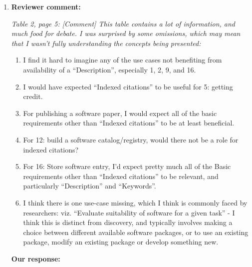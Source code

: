 \documentclass{article}
\begin{document}
\begin{enumerate}
\item \textbf{Reviewer comment:}
{\itshape
Table 2, page 5: [Comment] This table contains a lot of information, and much food for debate. I was surprised by some omissions, which may mean that I wasn't fully understanding the concepts being presented:
\begin{enumerate}[label={(\alph*)}]
\item I find it hard to imagine any of the use cases not benefiting from availability of a ``Description'', especially 1, 2, 9, and 16.
\item I would have expected ``Indexed citations'' to be useful for 5: getting credit.
\item For publishing a software paper, I would expect all of the basic requirements other than ``Indexed citations'' to be at least beneficial.
\item For 12: build a software catalog/registry, would there not be a role for indexed citations?
\item For 16: Store software entry, I'd expect pretty much all of the Basic requirements other than ``Indexed citations'' to be relevant, and particularly ``Description'' and ``Keywords''.
\item I think there is one use-case missing, which I think is commonly faced by researchers: viz. ``Evaluate suitability of software for a given task'' - I think this is distinct from discovery, and typically involves making a choice between different available software packages, or to use an existing package, modify an existing package or develop something new.
\end{enumerate}
}

\textbf{Our response:}


\end{enumerate}
\end{document}

